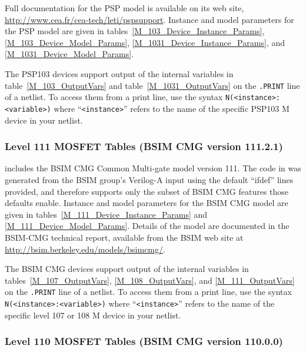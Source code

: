 Full documentation for the PSP model is available on its web site,
\url{http://www.cea.fr/cea-tech/leti/pspsupport}.  Instance and model
parameters for the PSP model are given in
tables~\ref{M_103_Device_Instance_Params}, \ref{M_103_Device_Model_Params},
\ref{M_1031_Device_Instance_Params}, and \ref{M_1031_Device_Model_Params}.

The PSP103 devices support output of the internal variables in
table~\ref{M_103_OutputVars} and table~\ref{M_1031_OutputVars} on the \texttt{.PRINT} line of a netlist.
To access them from a print line, use the syntax
\texttt{N(<instance>:<variable>)} where ``\texttt{<instance>}'' refers to the
name of the specific PSP103 M device in your netlist.








\clearpage

\subsubsection{Level 111 MOSFET Tables (BSIM CMG version 111.2.1)}
\Xyce{} includes the BSIM CMG Common Multi-gate model version 111.
The code in \Xyce{} was generated from the BSIM group's Verilog-A
input using the default ``ifdef'' lines provided, and therefore
supports only the subset of BSIM CMG features those defaults enable.
Instance and model parameters for the BSIM CMG model are given in
tables~\ref{M_111_Device_Instance_Params} and
\ref{M_111_Device_Model_Params}.  Details of the model are documented
in the BSIM-CMG technical report\cite{BSIMCMG:Manual}, available from
the BSIM web site at
\url{http://bsim.berkeley.edu/models/bsimcmg/}.

The BSIM CMG devices support output of the internal variables in
tables~\ref{M_107_OutputVars}, \ref{M_108_OutputVars}, and  \ref{M_111_OutputVars} on the \texttt{.PRINT} line of a netlist.
To access them from a print line, use the syntax
\texttt{N(<instance>:<variable>)} where ``\texttt{<instance>}'' refers to the
name of the specific level 107 or 108 M device in your netlist.






\subsubsection{Level 110 MOSFET Tables (BSIM CMG version 110.0.0)}

